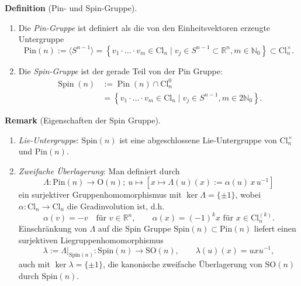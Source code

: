 \documentclass[10pt, letterpaper]{article}
\newcommand{\R}{\mathbb{R}}
\newcommand{\Cl}{\mathrm{Cl}}
\newcommand{\SO}{\mathrm{SO}}
\newcommand{\Spin}{\mathrm{Spin}}
\newcommand{\Pin}{\mathrm{Pin}}
\newcommand{\CustomHeading}[3]{%
  \par\medskip\noindent%
  \textbf{#1 #2} \textnormal{(#3)}.\enskip%
}
\newenvironment{DEF}[2]{\CustomHeading{Definition}{#1}{#2}}{}
\newenvironment{REM}[2]{\CustomHeading{Remark}{#1}{#2}}{}
\begin{document}
\begin{DEF}{}{Pin- und Spin-Gruppe}
\begin{enumerate}
\item Die \emph{Pin-Gruppe} ist definiert als die von den Einheitsvektoren erzeugte Untergruppe
\[
\Pin(n):=\langle S^{n-1}\rangle = \left\{v_1 \cdot \ldots \cdot v_m \in \mathrm{Cl}_n \mid v_j \in S^{n-1} \subset \mathbb{R}^n, m \in \mathbb{N}_0\right\} \subset \Cl_n^\times.
\]

\item Die \emph{Spin-Gruppe} ist der gerade Teil von der Pin Gruppe:
$$
\begin{aligned}
\operatorname{Spin}(n) & :=\operatorname{Pin}(n) \cap \mathrm{Cl}_n^0 \\
& =\left\{v_1 \cdot \ldots \cdot v_m \in \mathrm{Cl}_n \mid v_j \in S^{n-1}, m \in 2 \mathbb{N}_0\right\} .
\end{aligned}
$$
\end{enumerate}
\end{DEF}


\begin{REM}{}{Eigenschaften der Spin Gruppe}
  \begin{enumerate}
    \item \emph{Lie-Untergruppe}: $\Spin(n)$ ist eine abgeschlossene Lie-Untergruppe von $\Cl_n^\times$ und $\Pin(n)$.
    \item \emph{Zweifache Überlagerung}: Man definiert durch  
    \[
    \Lambda:\Pin(n)\to \mathrm{O}(n);\ u\mapsto [x\mapsto \Lambda(u)(x):=\alpha(u)\,x\,u^{-1}]
    \]
    ein surjektiver Gruppenhomomorphismus mit $\ker\Lambda=\{\pm 1\}$, wobei $\alpha:\Cl_n\to\Cl_n$ die Gradinvolution ist, d.h.
    \[
    \alpha(v)=-v \quad \text{für } v\in \R^n,
    \qquad
    \alpha(x)=(-1)^k x \text{ für } x\in \Cl_n^{(k)}.
    \]
    Einschränkung von $\Lambda$ auf die Spin Gruppe $\Spin(n)\subset\Pin(n)$ liefert einen surjektiven Liegruppenhomomorphismus
    \[
    \lambda:=\Lambda|_{\Spin(n)}:\Spin(n)\to \SO(n),
    \qquad
    \lambda(u)(x)=u x u^{-1},
    \]
    auch mit $\ker\lambda=\{\pm 1\}$, die kanonische zweifache Überlagerung von $\SO(n)$ durch $\Spin(n)$.
  \end{enumerate}
\end{REM}
\end{document}
